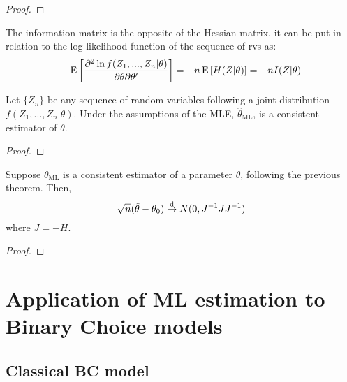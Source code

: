 \begin{proof}

\end{proof}

\begin{definition}
The information matrix is the opposite of the Hessian matrix, it can be put in relation to the log-likelihood function of the sequence of rvs as: $$-\operatorname{E}\left[\frac{\partial^2 \ln f(Z_1, ..., Z_n\vert \theta)}{\partial \theta\partial\theta'}\right] = - n\operatorname{E}\left[H(Z\vert\theta)\right] = -nI(Z\vert\theta) $$ 
\end{definition}

\begin{theorem}
Let $\{Z_n\}$ be any sequence of random variables following a joint distribution $f(Z_1, ..., Z_n\vert \theta)$. Under the assumptions of the MLE, $\hat\theta_{\text{ML}}$, is a consistent estimator of $\theta$.
\end{theorem}

\begin{proof}

\end{proof}

\begin{theorem}
Suppose $\theta_{\text{ML}}$ is a consistent estimator of a parameter $\theta$, following the previous theorem. Then, $$\sqrt{n}(\hat\theta - \theta_0)\overset{\text{d}}{\to} N(0, J^{-1}JJ^{-1}) $$ where $J = -H$.
\end{theorem}

\begin{proof}

\end{proof}

\section{Application of ML estimation to Binary Choice models}

\subsection{Classical BC model}

